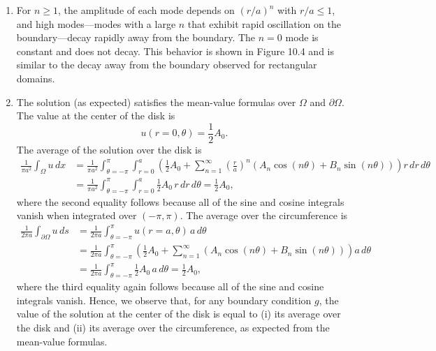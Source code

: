 \begin{enumerate}
    \item For $n \geq 1$, the amplitude of each mode depends on $(r/a)^n$ with $r/a \leq 1$, and high modes---modes with a large $n$ that exhibit rapid oscillation on the boundary---decay rapidly away from the boundary. The $n = 0$ mode is constant and does not decay. This behavior is shown in Figure 10.4 and is similar to the decay away from the boundary observed for rectangular domains.
    \item The solution (as expected) satisfies the mean-value formulas over $\Omega$ and $\partial\Omega$. The value at the center of the disk is
    \[u(r = 0, \theta) = \frac{1}{2}A_0.\]
    The average of the solution over the disk is
    \begin{align*}
        \frac{1}{\pi a^2} \int_\Omega u\,dx &= \frac{1}{\pi a^2} \int_{\theta=-\pi}^{\pi} \int_{r=0}^{a} \left(\frac{1}{2}A_0 + \sum_{n=1}^{\infty} \left(\frac{r}{a}\right)^n (A_n\cos(n\theta) + B_n\sin(n\theta))\right) r\,dr\,d\theta \\
        &= \frac{1}{\pi a^2} \int_{\theta=-\pi}^{\pi} \int_{r=0}^{a} \frac{1}{2}A_0\,r\,dr\,d\theta = \frac{1}{2}A_0,
    \end{align*}
    where the second equality follows because all of the sine and cosine integrals vanish when integrated over $(-\pi, \pi)$. The average over the circumference is
    \begin{align*}
        \frac{1}{2\pi a} \int_{\partial\Omega} u\,ds &= \frac{1}{2\pi a} \int_{\theta=-\pi}^{\pi} u(r = a, \theta)\,a\,d\theta \\
        &= \frac{1}{2\pi a} \int_{\theta=-\pi}^{\pi} \left(\frac{1}{2}A_0 + \sum_{n=1}^{\infty} (A_n\cos(n\theta) + B_n\sin(n\theta))\right) a\,d\theta \\
        &= \frac{1}{2\pi a} \int_{\theta=-\pi}^{\pi} \frac{1}{2}A_0\,a\,d\theta = \frac{1}{2}A_0,
    \end{align*}
    where the third equality again follows because all of the sine and cosine integrals vanish. Hence, we observe that, for any boundary condition $g$, the value of the solution at the center of the disk is equal to (i) its average over the disk and (ii) its average over the circumference, as expected from the mean-value formulas.
\end{enumerate}


